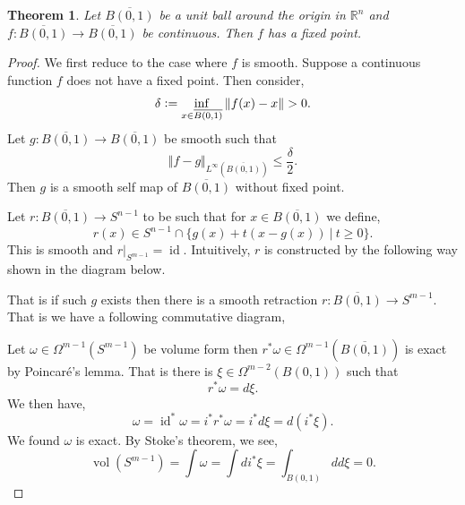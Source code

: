 \documentclass[8pt]{article}
\newtheorem{theorem}{Theorem} [section]
\DeclareMathOperator{\id}{id}
\DeclareMathOperator{\vol}{vol}
\newcommand{\defeq}{\vcentcolon=}
\newcommand{\norm}[1]{\Vert #1 \Vert}
\newcommand{\R}[0]{\mathbb{R}}
\newcommand{\sep}[0]{\:|\:}
\begin{document}
\begin{theorem}
  Let $\overline{B(0,1)}$ be a unit ball around the origin in $\R^n$ and $f:\overline{B(0,1)}\to \overline{B(0,1)}$ be continuous. Then $f$ has a fixed point.
\end{theorem}
\begin{proof}
  We first reduce to the case where $f$ is smooth. Suppose a continuous function $f$ does not have a fixed point. Then consider,
  \begin{equation*}
    \delta \defeq \inf_{x\in\overline{B(0,1)}}\norm{f(x)-x}>0.
  \end{equation*}
  Let $g:\overline{B(0,1)}\to \overline{B(0,1)}$ be smooth such that 
  \begin{equation*}
    \norm{f-g}_{L^\infty(\overline{B(0,1)})} \leq {\frac {\delta} 2}.
  \end{equation*}
  Then $g$ is a smooth self map of $\overline{B(0,1)}$ without fixed point.
  \par Let $r:\overline{B(0,1)}\to S^{n-1}$ to be such that for $x\in\overline{B(0,1)}$ we define,
  \begin{equation*}
    r(x) \in S^{n-1}\cap\{g(x)+t(x-g(x))\sep t\geq0\}.
  \end{equation*}
  This is smooth and $r|_{S^{m-1}}=\id$. Intuitively, $r$ is constructed by the following way shown in the diagram below.
  \begin{center}
  \end{center}
  That is if such $g$ exists then there is a smooth retraction $r:\overline{B(0,1)}\to S^{m-1}$. That is we have a following commutative diagram,
  \begin{center}
  \end{center}
Let $\omega\in\Omega^{m-1}(S^{m-1})$ be volume form then $r^*\omega\in\Omega^{m-1}(\overline{B(0,1)})$ is exact by Poincaré's lemma. That is there is $\xi\in \Omega^{m-2}(B(0,1))$ such that 
\begin{equation*}
  r^*\omega = d\xi.
\end{equation*}
We then have,
\begin{equation*}
  \omega = \id^*\omega = i^*r^*\omega = i^*d\xi = d(i^*\xi).
\end{equation*}
We found $\omega$ is exact. By Stoke's theorem, we see,
\begin{equation*}
  \vol(S^{m-1}) = \int\omega = \int di^*\xi = \int_{B(0,1)}dd\xi = 0.
\end{equation*}
\end{proof}
\end{document}
